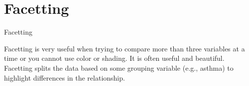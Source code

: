 \section{Facetting}\label{facetting}

\begin{frame}[fragile]{Facetting}

Facetting is very useful when trying to compare more than three
variables at a time or you cannot use color or shading. It is often
useful and beautiful. Facetting splits the data based on some grouping
variable (e.g., asthma) to highlight differences in the relationship.

\begin{Shaded}
\begin{Highlighting}[]
\OperatorTok{+}\StringTok{ }
\StringTok{  }\NormalTok{(} \NormalTok{,  }
         \NormalTok{(} \NormalTok{),}
         \NormalTok{(} \NormalTok{,}
                                         \NormalTok{),}
         \NormalTok{(} \NormalTok{)) }\OperatorTok{+}
\StringTok{  }\NormalTok{(} \NormalTok{,}
        \NormalTok{,}
        \NormalTok{,}
        \NormalTok{) }\OperatorTok{+}
\StringTok{  }\NormalTok{(}\OperatorTok{~}
\end{Highlighting}
\end{Shaded}

\end{frame}

